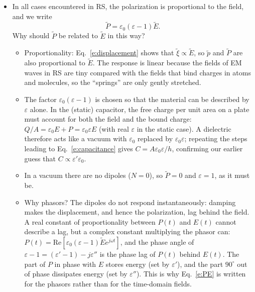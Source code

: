 \documentclass[11pt, oneside]{article}
\begin{document}
\begin{itemize}
\begin{itemize}
		\item $P$ has units of C/m$^2$, those of a surface charge density, and that is a useful way to picture it. In our capacitor example (Figure~\ref{f:water}b), the aligned dipoles leave a layer of bound charge on each face of the dielectric, $-P$ against the positive plate and $+P$ against the negative plate. This bound charge partly cancels the free charge $\pm Q/A$ on the plates, which is why the net field is reduced.
	\end{itemize}
	\item In all cases encountered in RS, the polarization is proportional to the field, and we write
	\begin{equation}
		\label{e:PE}
		\tilde{P} = \varepsilon_0(\varepsilon - 1)\tilde{E}.
	\end{equation}
	Why should $\tilde{P}$ be related to $\tilde{E}$ in this way?
	\begin{itemize}
		\item Proportionality: Eq.~\eqref{e:displacement} shows that $\tilde{\xi} \propto \tilde{E}$, so $\tilde{p}$ and $\tilde{P}$ are also proportional to $\tilde{E}$. The response is linear because the fields of EM waves in RS are tiny compared with the fields that bind charges in atoms and molecules, so the ``springs'' are only gently stretched.
		\item The factor $\varepsilon_0(\varepsilon - 1)$ is chosen so that the material can be described by $\varepsilon$ alone. In the (static) capacitor, the free charge per unit area on a plate must account for both the field and the bound charge: $Q/A = \varepsilon_0E + P = \varepsilon_0\varepsilon E$ (with real $\varepsilon$ in the static case). A dielectric therefore acts like a vacuum with $\varepsilon_0$ replaced by $\varepsilon_0\varepsilon$; repeating the steps leading to Eq.~\eqref{e:capacitance} gives $C = A\varepsilon_0\varepsilon/h$, confirming our earlier guess that $C \propto \varepsilon'\varepsilon_0$.
		\item In a vacuum there are no dipoles ($N = 0$), so $\tilde{P} = 0$ and $\varepsilon = 1$, as it must be.
		\item Why phasors? The dipoles do not respond instantaneously: damping makes the displacement, and hence the polarization, lag behind the field. A real constant of proportionality between $P(t)$ and $E(t)$ cannot describe a lag, but a complex constant multiplying the phasor can: $P(t) = \mathrm{Re}\left[\varepsilon_0(\varepsilon - 1)\tilde{E}e^{j\omega t}\right]$, and the phase angle of $\varepsilon - 1 = (\varepsilon' - 1) - j\varepsilon''$ is the phase lag of $P(t)$ behind $E(t)$. The part of $P$ in phase with $E$ stores energy (set by $\varepsilon'$), and the part $90^\circ$ out of phase dissipates energy (set by $\varepsilon''$). This is why Eq.~\eqref{e:PE} is written for the phasors rather than for the time-domain fields.

\end{itemize}
\end{itemize}
\end{document}
